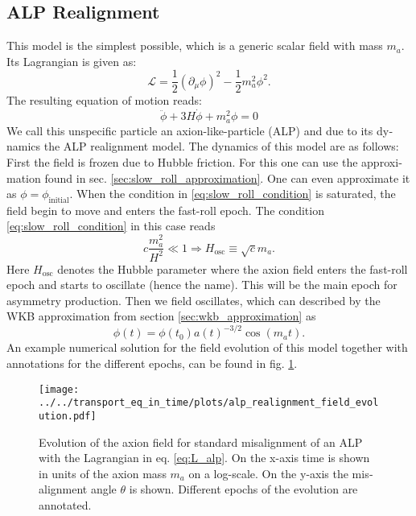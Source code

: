 \documentclass[master,       %
               twoside,        %
               BCOR10mm,       %
               english,ngerman, %
               ]{GAUBM}
\begin{document}
\begin{otherlanguage}{english}
\section{ALP Realignment}
This model is the simplest possible, which is a generic scalar field with mass $m_a$. Its Lagrangian is given as:
\begin{equation}
	\mathcal{L} = \frac{1}{2} \left( \partial_\mu \phi \right)^2 - \frac{1}{2} m_a^2 \phi^2.
	\label{eq:L_alp}
\end{equation}
The resulting equation of motion reads:
\begin{equation}
	\ddot{\phi} + 3 H \dot{\phi} + m_a^2 \phi = 0
\end{equation}
We call this unspecific particle an axion-like-particle (ALP) and due to its dynamics the ALP realignment model.
The dynamics of this model are as follows:
First the field is frozen due to Hubble friction. For this one can use the approximation found in sec. \ref{sec:slow_roll_approximation}. One can even approximate it as $\phi = \phi_\mathrm{initial}$.
When the condition in \eqref{eq:slow_roll_condition} is saturated, the field begin to move and enters the fast-roll epoch. The condition \eqref{eq:slow_roll_condition} in this case reads
\begin{equation}
	c \frac{m_a^2}{H^2} \ll 1 \Rightarrow H_\mathrm{osc} \equiv \sqrt{c} m_a.
\end{equation}
Here $H_\mathrm{osc}$ denotes the Hubble parameter where the axion field enters the fast-roll epoch and starts to oscillate (hence the name).
This will be the main epoch for asymmetry production. 
Then we field oscillates, which can described by the WKB approximation from section \ref{sec:wkb_approximation} as
\begin{equation}
	\phi(t) = \phi(t_0) a(t)^{-3/2} \cos(m_a t).
\end{equation}
An example numerical solution for the field evolution of this model together with annotations for the different epochs, can be found in fig. \ref{fig:alp_realignment_time_evolution}.
\begin{figure}[H]
	\label{fig:alp_realignment_time_evolution}
    \texttt{[image: ../../transport\_eq\_in\_time/plots/alp\_realignment\_field\_evolution.pdf]}
    \caption{Evolution of the axion field for standard misalignment of an ALP with the Lagrangian in eq. \eqref{eq:L_alp}. On the x-axis time is shown in units of the axion mass $m_a$ on a log-scale. On the y-axis the misalignment angle $\theta$ is shown. Different epochs of the evolution are annotated.}

\end{figure}
\end{otherlanguage}
\end{document}
